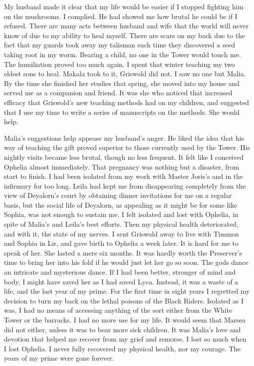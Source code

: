 \documentclass{article}
\begin{document}
My husband made it clear that my life would be easier if I stopped fighting him on the mushrooms. I complied. He had showed me how brutal he could be if I refused. There are many acts between husband and wife that the world will never know of due to my ability to heal myself. There are scars on my back due to the fact that my guards took away my talisman each time they discovered a seed taking root in my worm.  Bearing a child, no one in the Tower would touch me. The humiliation proved too much again. I spent that winter teaching my two eldest sons to heal. Makala took to it, Griswold did not. I saw no one but Malia. By the time she finished her studies that spring, she moved into my house and served me as a companion and friend. It was she who noticed that increased efficacy that Griswold's new teaching methods had on my children, and suggested that I use my time to write a series of manuscripts on the methods. She would help.

Malia's suggestions help appease my husband's anger. He liked the idea that his way of teaching the gift proved superior to those currently used by the Tower. His nightly visits became less brutal, though no less frequent. It felt like I conceived Ophelia almost immediately. That pregnancy was nothing but a disaster, from start to finish. I had been isolated from my work with Master Joris's and in the infirmary for too long. Leila had kept me from disappearing completely from the view of Deyalorn's court by obtaining dinner invitations for me on a regular basis, but the social life of Deyalorn, as appealing as it might be for some like Sophia, was not enough to sustain me. I felt isolated and lost with Ophelia, in spite of Malia's and Leila's best efforts. Then my physical health deteriorated, and with it, the state of my nerves. I sent Griswold away to live with Timmon and Sophia in Lir, and gave birth to Ophelia a week later. It is hard for me to speak of her. She lasted a mere six months. It was hardly worth the Preserver's time to bring her into his fold if he would just let her go so soon. The gods dance an intricate and mysterious dance. If I had been better, stronger of mind and body, I might have saved her as I had saved Lyca. Instead, it was a waste of a life, and the last year of my prime. For the first time in eight years I regretted my decision to turn my back on the lethal poisons of the Black Riders. Isolated as I was, I had no means of accessing anything of the sort either from the White Tower or the barracks. I had no more use for my life. It would seem that Marsea did not either, unless it was to bear more sick children. It was Malia's love and devotion that helped me recover from my grief and remorse. I lost so much when I lost Ophelia. I never fully recovered my physical health, nor my courage. The years of my prime were gone forever. 
\end{document}
